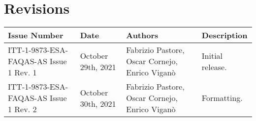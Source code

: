 
\section*{Revisions}
\label{sec:revisions}


\setlength\LTleft{0pt}
\setlength\LTright{0pt}
\tiny
\begin{longtable}{|p{2cm}|p{1cm}|p{1.5cm}|p{9cm}|@{}}
\label{table:codeoperators} \\
\hline
\textbf{Issue Number}&\textbf{Date}&\textbf{Authors}&\textbf{Description}\\
\hline
ITT-1-9873-ESA-FAQAS-AS
Issue 1 Rev. 1&
October 29th, 2021&
Fabrizio Pastore, Oscar Cornejo, Enrico Viganò&
\begin{minipage}{8cm}
Initial release.
\end{minipage}
\\

\hline
ITT-1-9873-ESA-FAQAS-AS
Issue 1 Rev. 2&
October 30th, 2021&
Fabrizio Pastore, Oscar Cornejo, Enrico Viganò&
\begin{minipage}{8cm}
Formatting.
\end{minipage}
\\

\hline

\end{longtable}
\normalsize

\clearpage
